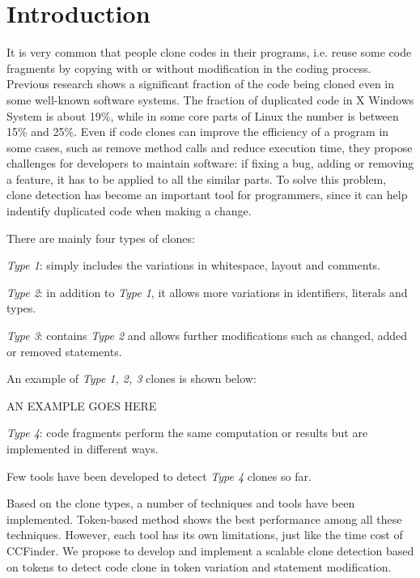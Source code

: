 \documentclass[../main.tex]{subfiles}
\begin{document}
\section{Introduction}

It is very common that people clone codes in their programs, i.e. reuse some code fragments by copying with or without modification in the coding process. 
Previous research shows a significant fraction of the code being cloned even in some well-known software systems. The fraction of duplicated code in X Windows System is about 19\%\cite{cloneinsys1}, while in some core parts of Linux the number is between 15\% and 25\%\cite{cloneinsys2}. 
Even if code clones can improve the efficiency of a program in some cases, such as remove method calls and reduce execution time, they propose challenges for developers to maintain software: if fixing a bug, adding or removing a feature, it has to be applied to all the similar parts. To solve this problem, clone detection has become an important tool for programmers, since it can help indentify duplicated code when making a change.

There are mainly four types of clones:

\indent \emph{Type 1}: simply includes the variations in whitespace, layout and comments.

\indent \emph{Type 2}: in addition to \emph{Type 1}, it allows more variations in identifiers, literals and types.

\indent \emph{Type 3}: contains \emph{Type 2} and allows further modifications such as changed, added or removed statements. 

An example of \emph{Type 1, 2, 3} clones is shown below:  

AN EXAMPLE GOES HERE

\indent \emph{Type 4}: code fragments perform the same computation or results but are implemented in different ways. 

Few tools have been developed to detect \emph{Type 4} clones so far. 




Based on the clone types, a number of techniques and tools have been implemented. Token-based method shows the best performance among all these techniques. However, each tool has its own limitations, just like the time cost of CCFinder. We propose to develop and implement a scalable clone detection based on tokens to detect code clone in token variation and statement modification.
\end{document}
